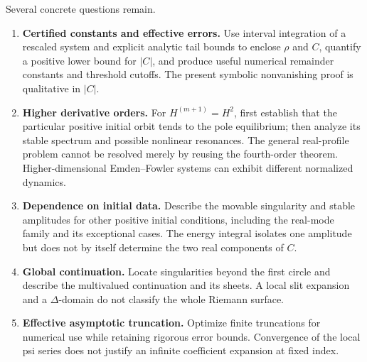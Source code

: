 \documentclass[11pt]{article}
\theoremstyle{remark}\newtheorem{remark}[theorem]{Remark}
\numberwithin{equation}{section}
\begin{document}
Several concrete questions remain.
\begin{enumerate}
\item \textbf{Certified constants and effective errors.}
Use interval integration of a rescaled system and explicit analytic
tail bounds to enclose $\rho$ and $C$, quantify a positive lower
bound for $|C|$, and produce useful numerical remainder constants
and threshold cutoffs. The present symbolic nonvanishing proof
is qualitative in $|C|$.
\item \textbf{Higher derivative orders.}
For $H^{(m+1)}=H^2$, first establish that the particular positive
initial orbit tends to the pole equilibrium; then analyze its
stable spectrum and possible nonlinear resonances. The general
real-profile problem cannot be resolved merely by reusing the
fourth-order theorem. Higher-dimensional Emden--Fowler systems
can exhibit different normalized dynamics.
\item \textbf{Dependence on initial data.}
Describe the movable singularity and stable amplitudes for other
positive initial conditions, including the real-mode family and
its exceptional cases. The energy integral isolates one amplitude
but does not by itself determine the two real components of $C$.
\item \textbf{Global continuation.}
Locate singularities beyond the first circle and describe the
multivalued continuation and its sheets. A local slit expansion
and a $\Delta$-domain do not classify the whole Riemann surface.
\item \textbf{Effective asymptotic truncation.}
Optimize finite truncations for numerical use while retaining
rigorous error bounds. Convergence of the local psi series does
not justify an infinite coefficient expansion at fixed index.
\end{enumerate}
\end{document}
